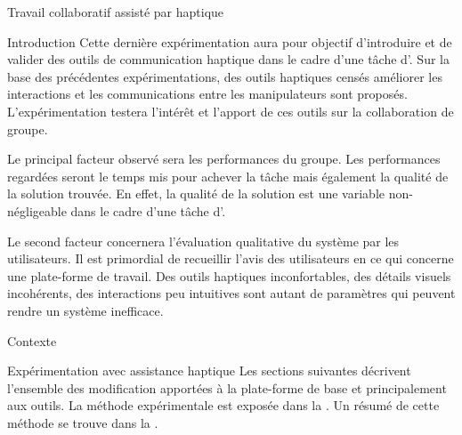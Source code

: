 \documentclass[myfrancais]{mythesis}
\begin{document}
	\begin{mychapter}{Travail collaboratif assisté par haptique}
		\begin{mysection}{Introduction}
			Cette dernière expérimentation aura pour objectif d'introduire et de valider des outils de communication haptique dans le cadre d'une tâche d'.
			Sur la base des précédentes expérimentations, des outils haptiques censés améliorer les interactions et les communications entre les manipulateurs sont proposés.
			L'expérimentation testera l'intérêt et l'apport de ces outils sur la collaboration de groupe.

			Le principal facteur observé sera les performances du groupe.
			Les performances regardées seront le temps mis pour achever la tâche mais également la qualité de la solution trouvée.
			En effet, la qualité de la solution est une variable non-négligeable dans le cadre d'une tâche d'.

			Le second facteur concernera l'évaluation qualitative du système par les utilisateurs.
			Il est primordial de recueillir l'avis des utilisateurs en ce qui concerne une plate-forme de travail.
			Des outils haptiques inconfortables, des détails visuels incohérents, des interactions peu intuitives sont autant de paramètres qui peuvent rendre un système inefficace.
		\end{mysection}
		\begin{mysection}{Contexte}
		\end{mysection}
		\begin{mysection}{Expérimentation avec assistance haptique}
			Les sections suivantes décrivent l'ensemble des modification apportées à la plate-forme de base  et principalement aux outils.
			La méthode expérimentale est exposée dans la .
			Un résumé de cette méthode se trouve dans la .


\end{mysection}
\end{mychapter}
\end{document}
